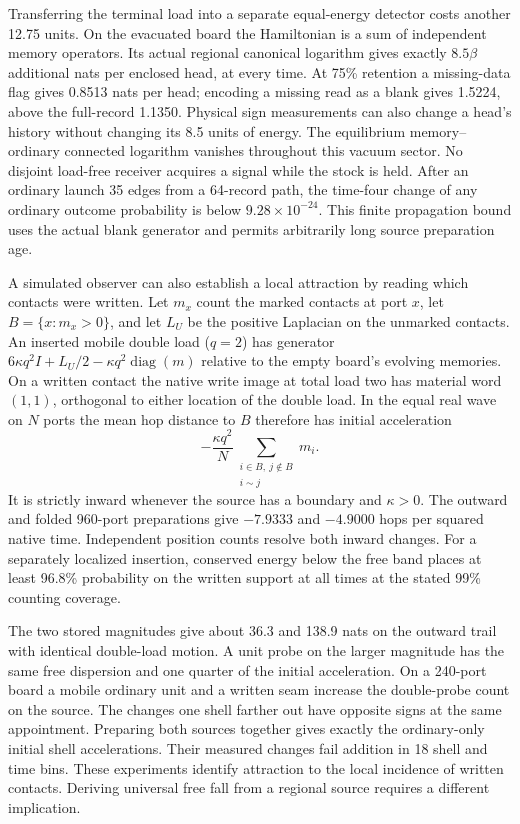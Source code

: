 \documentclass[11pt]{article}
\begin{document}
Transferring the terminal load into a separate equal-energy detector
costs another 12.75 units. On the evacuated board the Hamiltonian is a
sum of independent memory operators. Its actual regional canonical
logarithm gives exactly $8.5\beta$ additional nats per enclosed head,
at every time. At 75\% retention a missing-data flag gives 0.8513 nats
per head; encoding a missing read as a blank gives 1.5224, above the
full-record 1.1350. Physical sign measurements can also change a head's
history without changing its 8.5 units of energy. The equilibrium
memory--ordinary connected logarithm vanishes throughout this vacuum
sector. No disjoint load-free receiver acquires a signal while the
stock is held. After an ordinary launch 35 edges from a 64-record path,
the time-four change of any ordinary outcome probability is below
$9.28\times10^{-24}$. This finite propagation bound uses the actual
blank generator and permits arbitrarily long source preparation age.

A simulated observer can also establish a local attraction by reading
which contacts were written. Let $m_x$ count the marked contacts at port
$x$, let $B=\{x:m_x>0\}$, and let $L_U$ be the positive Laplacian on the
unmarked contacts. An inserted mobile double load ($q=2$) has generator
$6\kappa q^2 I+L_U/2-\kappa q^2\operatorname{diag}(m)$ relative to the
empty board's evolving memories. On a written contact the native write
image at total load two has material word $(1,1)$, orthogonal to either
location of the double load. In the equal real wave on $N$ ports the
mean hop distance to $B$ therefore has initial acceleration
\[
 -\frac{\kappa q^2}{N}\sum_{\substack{i\in B,\ j\notin B\\i\sim j}}m_i .
\]
It is strictly inward whenever the source has a boundary and $\kappa>0$.
The outward and folded 960-port preparations give $-7.9333$ and $-4.9000$
hops per squared native time. Independent position counts resolve both
inward changes. For a separately localized insertion, conserved energy
below the free band places at least 96.8\% probability on the written
support at all times at the stated 99\% counting coverage.

The two stored magnitudes give about 36.3 and 138.9 nats on the outward
trail with identical double-load motion. A unit probe on the larger
magnitude has the same free dispersion and one quarter of the initial
acceleration. On a 240-port board a mobile ordinary unit and a written
seam increase the double-probe count on the source. The changes one
shell farther out have opposite signs at the same appointment. Preparing
both sources together gives exactly the ordinary-only initial shell
accelerations. Their measured changes fail addition in 18 shell and
time bins. These experiments identify attraction to the local incidence
of written contacts. Deriving universal free fall from a regional
source requires a different implication.
\end{document}
